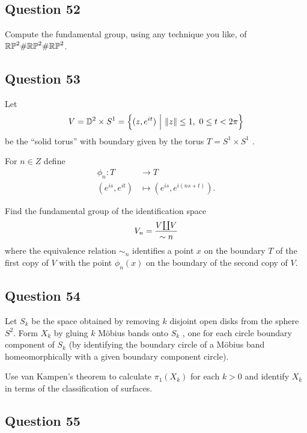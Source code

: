 \documentclass[12pt]{article}
\begin{document}
\hypertarget{question-52-3}{%
\subsection{Question 52}\label{question-52-3}}

Compute the fundamental group, using any technique you like, of
\({\mathbb{RP}}^2 \#{\mathbb{RP}}^2 \#{\mathbb{RP}}^2\).

\hypertarget{question-53-3}{%
\subsection{Question 53}\label{question-53-3}}

Let \[
V = {\mathbb{D}}^2 \times S^1 = \left\{{ (z, e^{it}) {~\mathrel{\Big|}~} {\left\lVert {z} \right\rVert} \leq 1,~~ 0 \leq t < 2\pi}\right\}
\] be the ``solid torus'' with boundary given by the torus
\(T = S^1 \times S^1\) .

For \(n \in Z\) define \begin{align*}
\phi_n : T &\to T \\
(e^{is} , e^{it} ) &\mapsto (e^{is} , e^{i(ns+t)})
.\end{align*}

Find the fundamental group of the identification space \[
V_n = {V{\coprod} V \over \sim n}
\] where the equivalence relation \(\sim_n\) identifies a point \(x\) on
the boundary \(T\) of the first copy of \(V\) with the point
\(\phi_n (x)\) on the boundary of the second copy of \(V\).

\hypertarget{question-54-3}{%
\subsection{Question 54}\label{question-54-3}}

Let \(S_k\) be the space obtained by removing \(k\) disjoint open disks
from the sphere \(S^2\). Form \(X_k\) by gluing \(k\) Möbius bands onto
\(S_k\) , one for each circle boundary component of \(S_k\) (by
identifying the boundary circle of a Möbius band homeomorphically with a
given boundary component circle).

Use van Kampen's theorem to calculate \(\pi_1 (X_k)\) for each \(k > 0\)
and identify \(X_k\) in terms of the classification of surfaces.

\hypertarget{question-55-3}{%
\subsection{Question 55}\label{question-55-3}}
\end{document}

